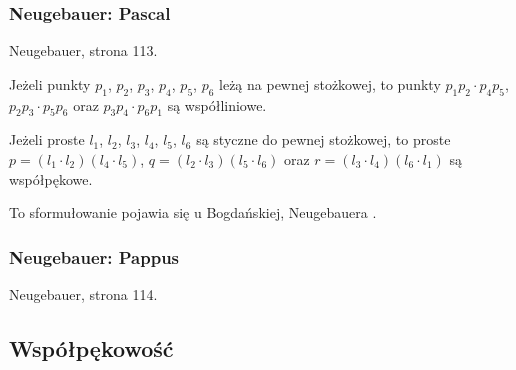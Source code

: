 \subsubsection{Neugebauer: Pascal}

\begin{proposition}
	Neugebauer, strona 113.
\end{proposition}


\begin{theorem}[Pascala]
	Jeżeli punkty $p_1$, $p_2$, $p_3$, $p_4$, $p_5$, $p_6$ leżą na pewnej stożkowej, to punkty $p_1p_2 \cdot p_4p_5$, $p_2p_3 \cdot p_5p_6$ oraz $p_3p_4 \cdot p_6p_1$ są współliniowe.
\end{theorem}

\begin{theorem}[Brianchona]
	Jeżeli proste $l_1$, $l_2$, $l_3$, $l_4$, $l_5$, $l_6$ są styczne do pewnej stożkowej, to proste $p = (l_1 \cdot l_2)(l_4 \cdot l_5)$, $q = (l_2 \cdot l_3)(l_5 \cdot l_6)$ oraz $r = (l_3 \cdot l_4)(l_6 \cdot l_1)$ są współpękowe.
\end{theorem}


To sformułowanie pojawia się u Bogdańskiej, Neugebauera \cite[s. 265, 266]{neugebauer_2018}.


\subsubsection{Neugebauer: Pappus}

\begin{proposition}
	Neugebauer, strona 114.
\end{proposition}



\subsection{Współpękowość}
